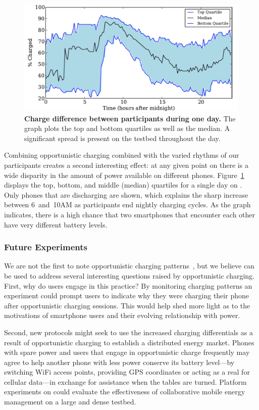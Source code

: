 \begin{figure}[t]
\includegraphics[width=\textwidth]{./figures/power/opportunistic_charging/max_difference/graph.pdf}
\caption{\textbf{Charge difference between participants during one day.} The
graph plots the top and bottom quartiles as well as the median. A significant
spread is present on the testbed throughout the day.}
\label{fig-opportunisticspread}
\end{figure}

Combining opportunistic charging combined with the varied rhythms of our
participants creates a second interesting effect: at any given point on
\PhoneLab{} there is a wide disparity in the amount of power available on
different phones. Figure~\ref{fig-opportunisticspread} displays the top,
bottom, and middle (median) quartiles for a single day on \PhoneLab{}. Only
phones that are discharging are shown, which explains the sharp increase
between 6~and~10AM as participants end nightly charging cycles.  As the graph
indicates, there is a high chance that two smartphones that encounter each
other have very different battery levels.

\subsubsection{Future Experiments}

We are not the first to note opportunistic charging
patterns~\cite{banerjee:ubicomp:2007, rahmati:mobilehci:2007}, but we believe
\PhoneLab{} can be used to address several interesting questions raised by
opportunistic charging. First, why do users engage in this practice? By
monitoring charging patterns an experiment could prompt users to indicate why
they were charging their phone after opportunistic charging sessions. This
would help shed more light as to the motivations of smartphone users and
their evolving relationship with power.

Second, new protocols might seek to use the increased charging differentials
as a result of opportunistic charging to establish a distributed energy
market. Phones with spare power and users that engage in opportunistic charge
frequently may agree to help another phone with less power conserve its
battery level---by switching WiFi access points, providing GPS coordinates or
acting as a real for cellular data---in exchange for assistance when the
tables are turned. Platform experiments on \PhoneLab{} could evaluate the
effectiveness of collaborative mobile energy management on a large and dense
testbed.
